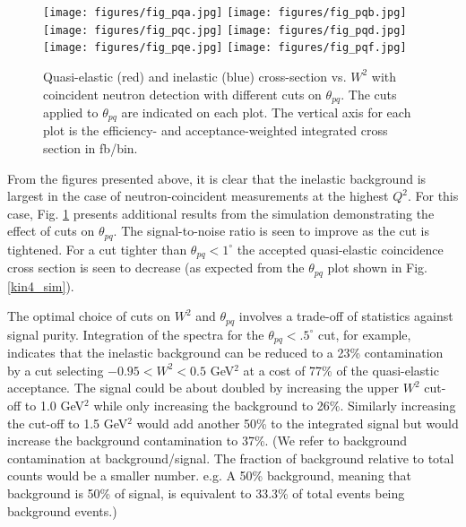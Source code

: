 \documentclass[12pt,letterpaper,oneside]{article}
\begin{document}
\begin{figure}
\vspace{-.25in}
\texttt{[image: figures/fig\_pqa.jpg]}\hfill
\texttt{[image: figures/fig\_pqb.jpg]}\\
\vfill
\texttt{[image: figures/fig\_pqc.jpg]}\hfill
\texttt{[image: figures/fig\_pqd.jpg]}\\
\vfill
\texttt{[image: figures/fig\_pqe.jpg]}\hfill
\texttt{[image: figures/fig\_pqf.jpg]}\\
\vfill

\vspace{-.2in}
\caption{\label{kin4_additional}
Quasi-elastic (red) and inelastic (blue)  cross-section vs. $W^2$ with coincident
neutron detection with different cuts on $\theta_{pq}$.  The cuts
applied to $\theta_{pq}$ are indicated on each plot.  The vertical axis
for each plot is the efficiency- and acceptance-weighted integrated
cross section in fb/bin.
   }
\end{figure}

From the figures presented above, it is clear that the 
inelastic background is largest in the
case of neutron-coincident measurements at the highest $Q^2$.  For
this case, Fig. \ref{kin4_additional} presents additional results 
from the simulation demonstrating the effect of cuts on $\theta_{pq}$.
The signal-to-noise ratio is seen to improve as the cut is tightened.
For a cut tighter than $\theta_{pq}<1^\circ$ the accepted
quasi-elastic coincidence cross section is seen to decrease (as expected from the 
$\theta_{pq}$ plot shown in Fig. \ref{kin4_sim}). 

The optimal choice of cuts on $W^2$ and $\theta_{pq}$ involves a
trade-off of statistics against signal purity.
Integration of the spectra for the
$\theta_{pq}<.5^\circ$ cut, for example, indicates that the 
inelastic background can be reduced to a 23\% contamination by a cut selecting
$-0.95<W^2<0.5$ GeV$^2$ at a cost of
77\% of the quasi-elastic acceptance.  The signal could be about
doubled by increasing the upper $W^2$ cut-off to 1.0 GeV$^2$ while
only increasing the background to 26\%.  Similarly  increasing the
cut-off to 1.5 GeV$^2$ would add another 50\% to the integrated signal
but would increase the background contamination to 37\%. (We refer to
background contamination at background/signal.  The fraction of
background relative to total counts would be a smaller number.
e.g. A 50\% background, meaning that background is 50\%
of signal, is equivalent to 33.3\% of total events being background events.)
\end{document}
